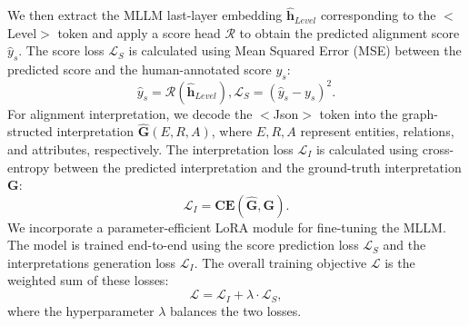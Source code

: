\documentclass[letterpaper]{article} %
\begin{document}
We then extract the MLLM last-layer embedding $ \hat{\mathbf{h}} _{Level}$ corresponding to the $<$Level$>$ token and apply a score head $\mathcal{R}$ to obtain the predicted alignment score $\hat{y} _{s}$. The score loss $\mathcal{L}_{S}$ is calculated using Mean Squared Error (MSE) between the predicted score and the human-annotated score $y _{s}$:
\begin{equation}
	\hat{y}_{s} = \mathcal{R}\left(\hat{\mathbf{h}}_{Level}\right), \mathcal{L}_{S} = (\hat{y}_{s} - y_{s})^2.
\end{equation}
For alignment interpretation, we decode the $<$Json$>$ token into the graph-structed interpretation $ \hat{\mathbf{G}}\left ( E,R,A \right )$, where $E, R, A$ represent entities, relations, and attributes, respectively. The interpretation loss $\mathcal{L}_{I}$ is calculated using cross-entropy between the predicted interpretation and the ground-truth interpretation $\mathbf{G}$:
\begin{equation}
	\mathcal{L}_{I} = \mathbf{CE}\left(\hat{\mathbf{G}}, \mathbf{G}\right).
\end{equation}
We incorporate a parameter-efficient LoRA module \cite{hu2022lora} for fine-tuning the MLLM. The model is trained end-to-end using the score prediction loss $\mathcal{L}_{S}$ and the interpretations generation loss $\mathcal{L}_{I}$. The overall training objective $\mathcal{L}$ is the weighted sum of these losses:
\begin{equation}
	\mathcal{L} =\mathcal{L}_{I} + \lambda \cdot \mathcal{L}_{S},
\end{equation}
where the hyperparameter $\lambda$ balances the two losses.
\end{document}
